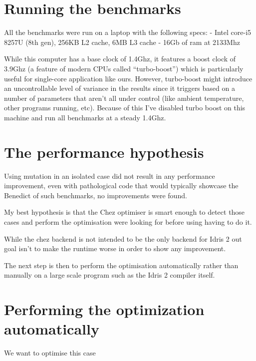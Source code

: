 \documentclass[
]{article}
\begin{document}
\hypertarget{running-the-benchmarks}{%
\section{Running the benchmarks}\label{running-the-benchmarks}}

All the benchmarks were run on a laptop with the following specs: -
Intel core-i5 8257U (8th gen), 256KB L2 cache, 6MB L3 cache - 16Gb of
ram at 2133Mhz

While this computer has a base clock of 1.4Ghz, it features a boost
clock of 3.9Ghz (a feature of modern CPUs called ``turbo-boost'') which
is particularly useful for single-core application like ours. However,
turbo-boost might introduce an uncontrollable level of variance in the
results since it triggers based on a number of parameters that aren't
all under control (like ambient temperature, other programs running,
etc). Because of this I've disabled turbo boost on this machine and run
all benchmarks at a steady 1.4Ghz.

\hypertarget{the-performance-hypothesis}{%
\section{The performance hypothesis}\label{the-performance-hypothesis}}

Using mutation in an isolated case did not result in any performance
improvement, even with pathological code that would typically showcase
the Benedict of such benchmarks, no improvements were found.

My best hypothesis is that the Chez optimiser is smart enough to detect
those cases and perform the optimisation were looking for before using
having to do it.

While the chez backend is not intended to be the only backend for Idris
2 out goal isn't to make the runtime worse in order to show any
improvement.

The next step is then to perform the optimisation automatically rather
than manually on a large scale program such as the Idris 2 compiler
itself.

\hypertarget{performing-the-optimization-automatically}{%
\section{Performing the optimization
automatically}\label{performing-the-optimization-automatically}}

We want to optimise this case
\end{document}
